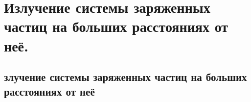 \chapter{Излучение системы заряженных частиц на больших расстояниях 
от неё.}

\section{злучение системы заряженных частиц на больших расстояниях 
от неё}
